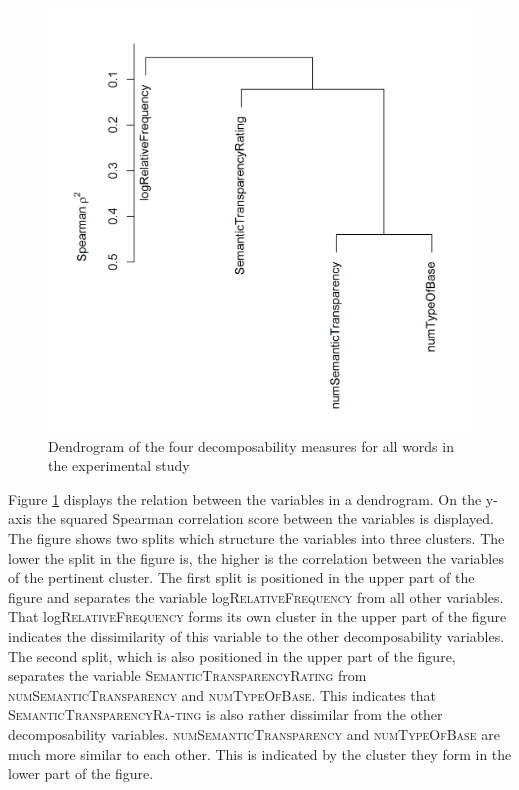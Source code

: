  \begin{figure} [b!]
 	\centering
 	\includegraphics[scale=0.5]{images/Experiment/clusterAnalysisDecomposabilityExperimentAllTokens.png}
 	\caption{ Dendrogram of the four decomposability measures for all words in the experimental study}
 	\label{fig:cluster experiment all affixes}
 \end{figure}
 
Figure \ref{fig:cluster experiment all affixes} displays the relation between the variables in a dendrogram. On the y-axis the squared Spearman correlation score between the variables is displayed. 
The figure shows two splits which structure the variables into three clusters. The lower the split in the figure is, the higher is the correlation between the variables of the pertinent cluster.
The first split is positioned in the upper part of the figure and separates the  variable log\textsc{RelativeFrequency} from all other variables. That log\textsc{RelativeFrequency} forms its own cluster in the upper part of the figure indicates the dissimilarity of this variable to the other decomposability variables. 
The second split, which is also positioned in the upper part of the figure, separates the variable \textsc{SemanticTransparencyRating} from \textsc{numSemanticTransparency} and \textsc{numTypeOfBase}. This indicates that \textsc{SemanticTransparencyRa-ting} is also rather dissimilar from the other decomposability variables. 
\textsc{numSemanticTransparency} and \textsc{numTypeOfBase} are much more similar to each other. This is indicated by the cluster they form in the lower part of the figure. 

